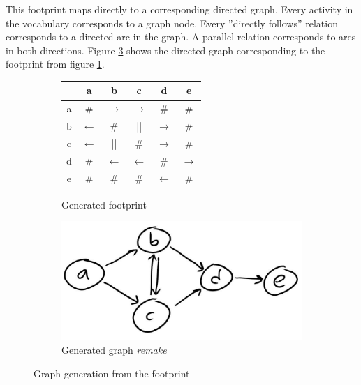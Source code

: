 \documentclass[english,12pt,a4paper,pdftex,sci,utf8]{aaltothesis}
\theoremstyle{definition}
\newcommand{\nyi}[1]{\noindent\colorbox{nyibg}{\textcolor{nyitext}{\emph{#1}}}}
\begin{document}
This footprint maps directly to a corresponding directed graph.
Every activity in the vocabulary corresponds to a graph node.
Every ''directly follows'' relation corresponds to a directed arc in the graph. A parallel relation corresponds to arcs in both directions.
Figure \ref{fig:examplegraph} shows the directed graph corresponding to the footprint from figure \ref{tab:examplefootprint}.


\begin{figure}
    \centering
    \begin{subfigure}[h]{0.4\linewidth}
        \begin{center}
        \begin{tabular}{cccccc}
        \hline
          & a & b & c & d & e\\
        \hline
        a & \# & $\rightarrow$ & $\rightarrow$ & \# & \# \\
        b & $\leftarrow$ & \# & || & $\rightarrow$ & \# \\
        c & $\leftarrow$ & || & \# & $\rightarrow$ & \# \\
        d & \# & $\leftarrow$ & $\leftarrow$ & \# & $\rightarrow$ \\
        e & \# & \# & \# & $\leftarrow$ & \# \\
        \hline
        \end{tabular}
        \end{center}
        \caption{Generated footprint}
        \label{tab:examplefootprint}
    \end{subfigure}
    \begin{subfigure}[h]{0.4\linewidth}
        \centering \includegraphics[width=\linewidth]{gfx/graphthing.jpg}
        \caption{Generated graph \nyi{remake}}
        \label{fig:examplegraph}
    \end{subfigure}
    \caption{Graph generation from the footprint}
\end{figure}
\end{document}

